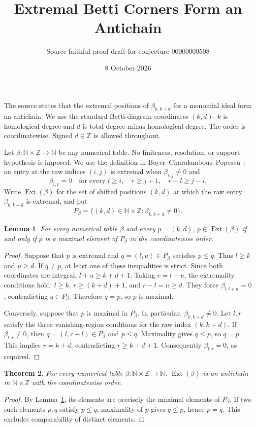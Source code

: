 \documentclass[11pt]{article}
\title{Extremal Betti Corners Form an Antichain}
\author{Source-faithful proof draft for conjecture 00000000508}
\date{8 October 2026}
\newcommand{\N}{\mathbb{N}}
\newcommand{\Z}{\mathbb{Z}}
\newtheorem{theorem}{Theorem}
\newtheorem{lemma}[theorem]{Lemma}
\begin{document}
\maketitle

The source states that the extremal positions of $\beta_{k,k+d}$ for a
monomial ideal form an antichain. We use the standard Betti-diagram
coordinates $(k,d)$: $k$ is homological degree and $d$ is total degree
minus homological degree. The order is coordinatewise. Signed $d\in\Z$
is allowed throughout.

Let $\beta:\N\times\Z\longrightarrow\N$ be any numerical table. No
finiteness, resolution, or support hypothesis is imposed. We use the
definition in Bayer--Charalambous--Popescu~\cite{BCP}: an entry at the raw
indices $(i,j)$ is extremal when $\beta_{i,j}\ne0$ and
\[
 \beta_{l,r}=0\quad\text{for every }l\ge i,\quad r\ge j+1,
 \quad r-l\ge j-i.
\]
Write $\operatorname{Ext}(\beta)$ for the set of shifted positions
$(k,d)$ at which the raw entry $\beta_{k,k+d}$ is extremal, and put
\[
 P_\beta=\{(k,d)\in\N\times\Z:\beta_{k,k+d}\ne0\}.
\]

\begin{lemma}\label{lem:maximal}
For every numerical table $\beta$ and every $p=(k,d)$,
$p\in\operatorname{Ext}(\beta)$ if and only if $p$ is a maximal
element of $P_\beta$ in the coordinatewise order.
\end{lemma}
\begin{proof}
Suppose that $p$ is extremal and $q=(l,u)\in P_\beta$ satisfies
$p\le q$. Thus $l\ge k$ and $u\ge d$. If $q\ne p$, at least one
of these inequalities is strict. Since both coordinates are integral,
$l+u\ge k+d+1$. Taking $r=l+u$, the extremality conditions hold:
$l\ge k$, $r\ge(k+d)+1$, and $r-l=u\ge d$. They force
$\beta_{l,l+u}=0$, contradicting $q\in P_\beta$. Therefore $q=p$,
so $p$ is maximal.

Conversely, suppose that $p$ is maximal in $P_\beta$. In particular,
$\beta_{k,k+d}\ne0$. Let $l,r$ satisfy the three vanishing-region
conditions for the raw index $(k,k+d)$. If $\beta_{l,r}\ne0$, then
$q=(l,r-l)\in P_\beta$ and $p\le q$. Maximality gives $q\le p$,
so $q=p$. This implies $r=k+d$, contradicting $r\ge k+d+1$.
Consequently $\beta_{l,r}=0$, as required.
\end{proof}

\begin{theorem}\label{thm:antichain}
For every numerical table $\beta:\N\times\Z\to\N$,
$\operatorname{Ext}(\beta)$ is an antichain in $\N\times\Z$ with
the coordinatewise order.
\end{theorem}
\begin{proof}
By Lemma~\ref{lem:maximal}, its elements are precisely the maximal
elements of $P_\beta$. If two such elements $p,q$ satisfy $p\le q$,
maximality of $p$ gives $q\le p$, hence $p=q$. This excludes
comparability of distinct elements.
\end{proof}
\end{document}
